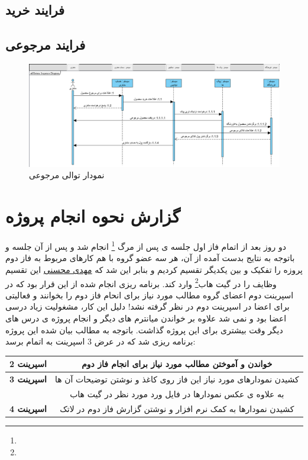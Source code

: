 \documentclass[12pt,a4paper]{article}
\begin{document}
	\subsection{فرایند خرید} \label{section.sequence.buy}
	
	
	\subsection{فرایند مرجوعی} \label{section.sequence.return}
		\begin{figure}[h!]
			\begin{center}
				\includegraphics[width=14cm]{images/Return Sequence Diagram.png}
			\end{center}
			\caption{نمودار توالی مرجوعی}
		\end{figure}
		
		\pagebreak
	

\pagebreak

\section{گزارش نحوه انجام پروژه} \label{section.report}
	دو روز بعد از اتمام فاز اول جلسه ی پس از مرگ \footnote{} انجام شد و پس از آن جلسه و باتوجه به نتایج بدست آمده از آن، هر سه عضو گروه با هم کارهای مربوط به فاز دوم پروزه را تفکیک و بین یکدیگر تقسیم کردیم و بنابر این شد که \underline{مهدی محسنی} این تقسیم وظایف را در گیت هاب\footnote{} وارد کند. برنامه ریزی انجام شده از این قرار بود که در اسپرینت دوم اعضای گروه مطالب مورد نیاز برای انحام فاز دوم را بخوانند و فعالیتی برای اعضا در اسپرینت دوم در نظر گرفته نشد! دلیل این کار، مشغولیت زیاد درسی اعضا بود و نمی شد علاوه بر خواندن میانترم های دیگر و انجام پروژه ی درس های دیگر وقت بیشتری برای این پروژه گذاشت. باتوجه به مطالب بیان شده این پروژه برنامه ریزی شد که در عرض 3 اسپرینت به اتمام برسد:
	\begin{center}
		\begin{tabular}{|c|c|} 
			\hline
			\textbf{اسپرینت 2 } & خواندن و آموختن مطالب مورد نیاز برای انجام فاز دوم\\
			\hline
			\hline
			\textbf{اسپرینت 3 } & کشیدن نمودارهای مورد نیاز این فاز روی کاغذ و  نوشتن توضیحات آن ها \\
						 & به علاوه ی عکس نمودارها در فایل ورد مورد نظر در گیت هاب \\
			\hline
			\hline
			\textbf{اسپرینت 4} & کشیدن نمودارها به کمک نرم افزار و نوشتن گزارش فاز دوم در لاتک\\
			\hline
		\end{tabular}
	\end{center}
\end{document}
